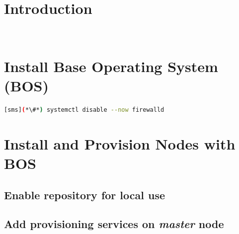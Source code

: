 \documentclass[letterpaper]{article}
\begin{document}
\graphicspath{{common/figures/}}
\thispagestyle{empty}




\newpage
\tableofcontents
\newpage


\section{Introduction} \label{sec:introduction}

 \\








\vspace*{0.2cm}
\section{Install Base Operating System (BOS)}


\begin{lstlisting}[language=bash,keywords={}]
[sms](*\#*) systemctl disable --now firewalld
\end{lstlisting}


\section{Install \xCAT{} and Provision Nodes with BOS} \label{sec:provision_compute_bos}


\subsection{Enable \xCAT{} repository for local use} \label{sec:enable_xcat}


\subsection{Add provisioning services on {\em master} node} \label{sec:add_provisioning}

\end{document}
